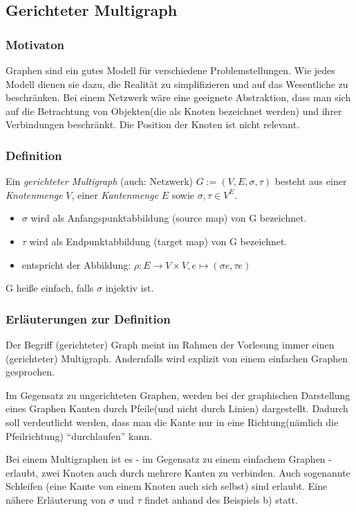 \subsection{Gerichteter Multigraph}
\subsubsection{Motivaton}
Graphen sind ein gutes Modell für verschiedene Problemstellungen.
Wie jedes Modell dienen sie dazu, die Realität zu simplifizieren und auf das Wesentliche zu beschränken.
Bei einem Netzwerk wäre eine geeignete Abstraktion, dass man sich auf die Betrachtung von Objekten(die als Knoten bezeichnet werden) und ihrer Verbindungen beschränkt.
Die Position der Knoten ist nicht relevant.

\subsubsection{Definition}
Ein \emph{gerichteter Multigraph} (auch: Netzwerk) $G:= (V,E,\sigma,\tau) $ besteht aus einer \emph{Knotenmenge} $V$, einer \emph{Kantenmenge} $E$ sowie
$\sigma , \tau \in V^E $.
\begin{itemize}
\item $\sigma $ wird als Anfangspunktabbildung (source map) von G bezeichnet.
\item $\tau $ wird als Endpunktabbildung (target map) von G bezeichnet.
\item entspricht der Abbildung: $\rho : E \rightarrow V \times V, e \mapsto (\sigma e, \tau e) $
\end{itemize}
G heiße einfach, falls $\sigma$ injektiv ist.

\subsubsection{Erläuterungen zur Definition}
Der Begriff (gerichteter) Graph meint im Rahmen der Vorlesung immer einen (gerichteter) Multigraph. 
Andernfalls wird explizit von einem einfachen Graphen gesprochen.

Im Gegensatz zu ungerichteten Graphen, werden bei der graphischen Darstellung eines Graphen Kanten durch Pfeile(und nicht durch Linien) dargestellt.
Dadurch soll verdeutlicht werden, dass man die Kante nur in eine Richtung(nämlich die Pfeilrichtung) ``durchlaufen'' kann.

Bei einem Multigraphen ist es - im Gegensatz zu einem einfachem Graphen - erlaubt, zwei Knoten auch durch mehrere Kanten zu verbinden.
Auch sogenannte Schleifen (eine Kante von einem Knoten auch sich selbst) sind erlaubt.
Eine nähere Erläuterung von $\sigma$ und $\tau$ findet anhand des Beispiels b) statt.

